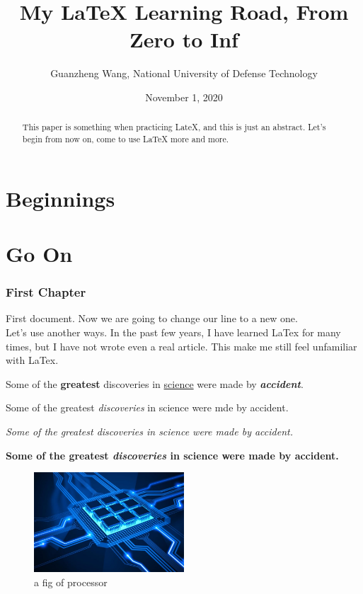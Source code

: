 \documentclass[12pt, letterpaper, twoside]{article}
\title{My LaTeX	 Learning Road, From Zero to Inf}
\author{Guanzheng Wang, National University of Defense Technology}
\date{November 1, 2020}
\begin{document}
\maketitle

\begin{abstract}
This paper is something when practicing LateX, and this is just an abstract. Let's begin from now on, come to use LaTeX more and more.
\end{abstract}

\part{Beginnings}

\part{Go On}

\section{First Chapter}


First document. Now we are going to change our line to a new one.\\
Let's use another ways.
\newline
In the past few years, I have learned LaTex for many times, but I have not wrote even a real article. This make me still feel unfamiliar with LaTex.



Some of the \textbf{greatest} discoveries in \underline{science} were made by \textbf{\textit{accident}}.

Some of the greatest \emph{discoveries} in science were mde by accident.

\textit{Some of the greatest \emph{discoveries} in science were made by accident.}

\textbf{Some of the greatest \emph{discoveries} in science were made by accident.}


\begin{figure}[h]
	\centering
	\includegraphics[width=0.5\textwidth]{parallel_computing}
	\caption{a fig of processor}
	\label{fig:processor}
\end{figure}
\end{document}
